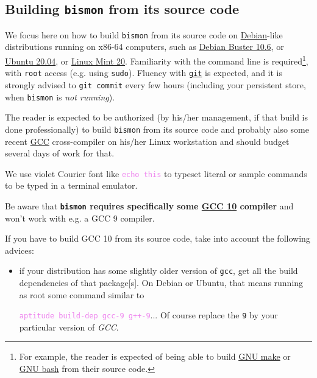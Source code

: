 

\begin{appendices}


\section{Building \texttt{bismon} from its source code}
\label{sec:building-bismon}

We focus here on how to build \texttt{bismon} from its source code on
\href{http://debian.org/}{Debian}-like distributions running on x86-64
computers, such as
\href{https://www.debian.org/releases/stable/}{Debian Buster 10.6}, or
\href{https://ubuntu.com/}{Ubuntu 20.04}, or
\href{https://linuxmint.com/}{Linux Mint 20}. Familiarity with the
command line is required\footnote{For example, the reader is expected
  of being able to build \href{https://www.gnu.org/software/make/}{GNU
    make} or \href{https://www.gnu.org/software/bash/}{GNU bash} from
  their source code.}, with \texttt{root} access (e.g. using
\texttt{sudo}). Fluency with \href{https://git-scm.com/}{\texttt{git}}
is expected, and it is strongly advised to \texttt{git commit} every
few hours (including your persistent store, when \texttt{bismon} is
\emph{not running}).

The reader is expected to be authorized (by his/her management, if
that build is done professionally) to build \texttt{bismon} from its
source code and probably also some recent
\href{https://gcc.gnu.org/}{GCC} cross-compiler on his/her Linux workstation
and should budget several days of work for that.


We use violet Courier font like {\textcolor{violet}{\texttt{echo this}}}
to typeset literal or sample commands to be typed in a terminal
emulator.
  
{\large Be aware that \textbf{\texttt{bismon} requires specifically some
  \href{https://gcc.gnu.org/gcc-10/}{GCC 10} compiler} and won't work
  with e.g. a GCC 9 compiler.}


If you have to build GCC 10 from its source code, take into account the following advices:

\begin{itemize}

\item if your distribution has some slightly older version of
  \texttt{gcc}, get all the build dependencies of that package[s]. On
  Debian or Ubuntu, that means running as root some command similar to
  {\textcolor{violet}{\texttt{aptitude build-dep gcc-9 g++-9}}... Of
    course replace the \texttt{9} by your particular version of
    \textit{GCC}.

}
\end{itemize}
\end{appendices}
